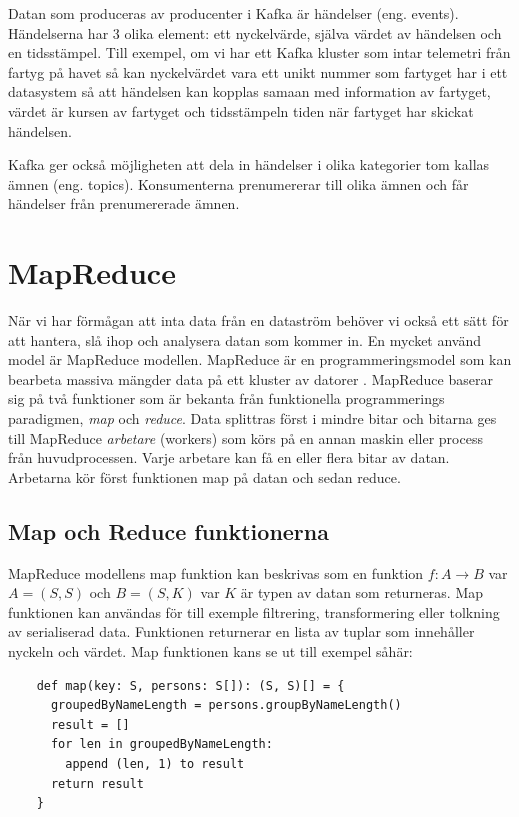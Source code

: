 Datan som produceras av producenter i Kafka är händelser (eng. events). Händelserna har 3 olika
element: ett nyckelvärde, själva värdet av händelsen och en tidsstämpel. Till exempel, om vi har ett Kafka kluster som intar telemetri från fartyg på havet så kan nyckelvärdet vara ett unikt nummer som fartyget har i ett datasystem så att händelsen kan kopplas samaan med information av fartyget, värdet är kursen av fartyget och tidsstämpeln tiden när fartyget har skickat händelsen.

Kafka ger också möjligheten att dela in händelser i olika kategorier tom kallas ämnen (eng. topics). Konsumenterna prenumererar till olika ämnen och får händelser från prenumererade ämnen.

\section{MapReduce}

När vi har förmågan att inta data från en dataström behöver vi också ett sätt för att hantera, slå ihop och analysera datan som kommer in. En mycket använd model är MapReduce modellen. MapReduce är en programmeringsmodel som kan bearbeta massiva mängder data på ett kluster av datorer \citep{dean2008mapreduce}. MapReduce baserar sig på två funktioner 
som är bekanta från funktionella programmerings paradigmen, \textit{map} och \textit{reduce}. Data splittras först i mindre bitar och bitarna ges till MapReduce \textit{arbetare} (workers) som körs på en annan maskin eller process från huvudprocessen. Varje arbetare
kan få en eller flera bitar av datan. Arbetarna kör först funktionen map på datan och sedan reduce.

\subsection{Map och Reduce funktionerna}

MapReduce modellens map funktion kan beskrivas som en funktion $f: A \rightarrow B$ var $A = (S, S)$ och $B = (S, K)$ var $K$ är typen av datan som returneras. Map funktionen kan användas för till exemple filtrering,
transformering eller tolkning av serialiserad data. Funktionen returnerar en lista av tuplar som innehåller nyckeln och värdet. Map funktionen kans se ut till exempel såhär:

\begin{verbatim}
    def map(key: S, persons: S[]): (S, S)[] = {
      groupedByNameLength = persons.groupByNameLength()
      result = []
      for len in groupedByNameLength:
        append (len, 1) to result
      return result
    }
\end{verbatim}

